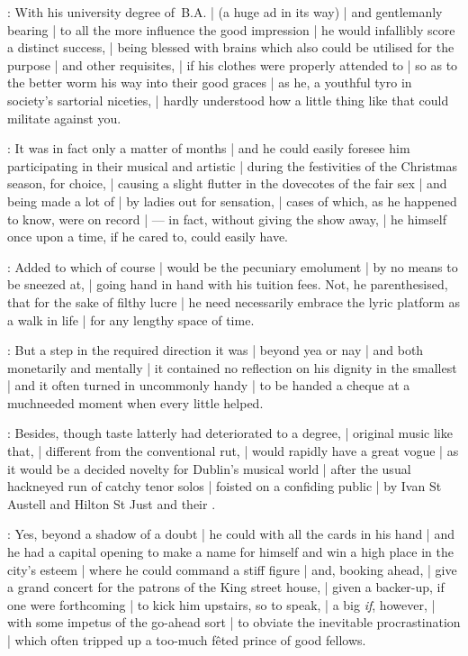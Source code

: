:
With his university degree of~B.A. |
(a huge ad in its way) |
and gentlemanly bearing |
to all the more influence the good impression |
he would infallibly score a distinct success, |
being blessed with brains which also could be utilised for the purpose |
and other requisites, |
if his clothes were properly attended to |
so as to the better worm his way into their good graces |
as he, a youthful tyro in society's sartorial niceties, |
hardly understood how a little thing like that could militate against you.

:
It was in fact only a matter of months |
and he could easily foresee him participating
in their musical and artistic  |
during the festivities of the Christmas season, for choice, |
causing a slight flutter in the dovecotes of the fair sex |
and being made a lot of |
by ladies out for sensation, |
cases of which, as he happened to know, were on record |
--- in fact, without giving the show away, |
he himself once upon a time, if he cared to, could easily have.

:
Added to which of course |
would be the pecuniary emolument |
by no means to be sneezed at, |
going hand in hand with his tuition fees.
Not, he parenthesised, that for the sake of filthy lucre |
he need necessarily embrace the lyric platform as a walk in life |
for any lengthy space of time.

:
But a step in the required direction it was |
beyond yea or nay |
and both monetarily and mentally |
it contained no reflection on his dignity in the smallest |
and it often turned in uncommonly handy |
to be handed a cheque at a muchneeded moment when every little helped.

:
Besides, though taste latterly had deteriorated to a degree, |
original music like that, |
different from the conventional rut, |
would rapidly have a great vogue |
as it would be a decided novelty for Dublin's musical world |
after the usual hackneyed run of catchy tenor solos |
foisted on a confiding public |
by Ivan St Austell and Hilton St Just and their .

:
Yes, beyond a shadow of a doubt |
he could with all the cards in his hand |
and he had a capital opening to make a name for himself
and win a high place in the city's esteem |
where he could command a stiff figure |
and, booking ahead, |
give a grand concert for the patrons of the King street house, |
given a backer-up, if one were forthcoming |
to kick him upstairs, so to speak, |
a big \emph{if}, however, |
with some impetus of the go-ahead sort |
to obviate the inevitable procrastination |
which often tripped up a too-much fêted prince of good fellows.

